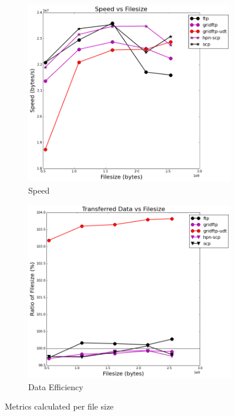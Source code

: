 \documentclass{sig-alternate-05-2015}
\begin{document}
\begin{figure}
\centering
	\begin{subfigure}{.45\textwidth}
	\includegraphics[width=\textwidth]{img/per_filesize/speed.png}
	\caption{Speed}
	\label{fig:per_fs_speed}
	\end{subfigure}
	\begin{subfigure}{.45\textwidth}
	\includegraphics[width=\textwidth]{img/per_filesize/data.png}
	\caption{Data Efficiency}
	\label{fig:per_fs_data}
	\end{subfigure}
\caption{Metrics calculated per file size}
\label{fig:per_fs}
\end{figure}
\end{document}
